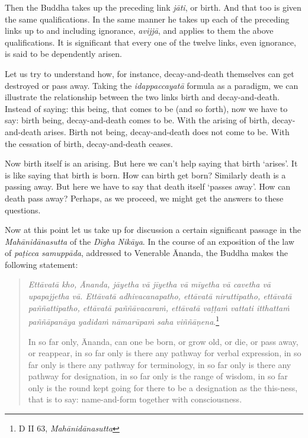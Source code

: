Then the Buddha takes up the preceding link \emph{jāti}, or birth. And that too is given the same qualifications. In the same manner he takes up each of the preceding links up to and including ignorance, \emph{avijjā}, and applies to them the above qualifications. It is significant that every one of the twelve links, even ignorance, is said to be dependently arisen.

Let us try to understand how, for instance, decay-and-death themselves can get destroyed or pass away. Taking the \emph{idappaccayatā} formula as a paradigm, we can illustrate the relationship between the two links birth and decay-and-death. Instead of saying: this being, that comes to be (and so forth), now we have to say: birth being, decay-and-death comes to be. With the arising of birth, decay-and-death arises. Birth not being, decay-and-death does not come to be. With the cessation of birth, decay-and-death ceases.

Now birth itself is an arising. But here we can't help saying that birth `arises'. It is like saying that birth is born. How can birth get born? Similarly death is a passing away. But here we have to say that death itself `passes away'. How can death pass away? Perhaps, as we proceed, we might get the answers to these questions.

Now at this point let us take up for discussion a certain significant passage in the \emph{Mahānidānasutta} of the \emph{Dīgha Nikāya}. In the course of an exposition of the law of \emph{paṭicca samuppāda}, addressed to Venerable Ānanda, the Buddha makes the following statement:

\begin{quote}
\emph{Ettāvatā kho, Ānanda, jāyetha vā jīyetha vā mīyetha vā cavetha vā upapajjetha vā. Ettāvatā adhivacanapatho, ettāvatā niruttipatho, ettāvatā paññattipatho, ettāvatā paññāvacaraṁ, ettāvatā vaṭṭaṁ vattati itthattaṁ paññāpanāya yadidaṁ nāmarūpaṁ saha viññāṇena}.\footnote{D II 63, \emph{Mahānidānasutta}}

In so far only, Ānanda, can one be born, or grow old, or die, or pass away, or reappear, in so far only is there any pathway for verbal expression, in so far only is there any pathway for terminology, in so far only is there any pathway for designation, in so far only is the range of wisdom, in so far only is the round kept going for there to be a designation as the this-ness, that is to say: name-and-form together with consciousness.
\end{quote}

